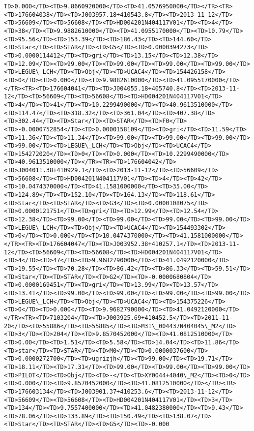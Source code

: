 \documentclass[11pt]{article}
\begin{document}
\begin{Verbatim}[commandchars=\\\{\}]
TD>0.000</TD><TD>9.8660920000</TD><TD>41.0576950000</TD></TR><TR><TD>176604038</TD><TD>J003957.18+410543.8</TD><TD>2013-11-12</TD><TD>56609</TD><TD>56608</TD><TD>HD004201N404117V01</TD><TD>4</TD><TD>38</TD><TD>9.9882610000</TD><TD>41.0955170000</TD><TD>10.79</TD><TD>95.56</TD><TD>153.39</TD><TD>186.43</TD><TD>144.60</TD><TD>Star</TD><TD>STAR</TD><TD>G5</TD><TD>0.0000394273</TD><TD>0.0000114412</TD><TD>gri</TD><TD>13.15</TD><TD>12.38</TD><TD>12.09</TD><TD>99.00</TD><TD>99.00</TD><TD>99.00</TD><TD>99.00</TD><TD>LEGUE\_LCH</TD><TD>Obj</TD><TD>UCAC4</TD><TD>154426158</TD><TD>0</TD><TD>0.000</TD><TD>9.9882610000</TD><TD>41.0955170000</TD></TR><TR><TD>176604041</TD><TD>J004055.18+405740.8</TD><TD>2013-11-12</TD><TD>56609</TD><TD>56608</TD><TD>HD004201N404117V01</TD><TD>4</TD><TD>41</TD><TD>10.2299490000</TD><TD>40.9613510000</TD><TD>114.47</TD><TD>318.32</TD><TD>361.04</TD><TD>407.38</TD><TD>302.44</TD><TD>Star</TD><TD>STAR</TD><TD>F0</TD><TD>-0.0000752854</TD><TD>0.0000158109</TD><TD>gri</TD><TD>11.59</TD><TD>11.36</TD><TD>11.34</TD><TD>99.00</TD><TD>99.00</TD><TD>99.00</TD><TD>99.00</TD><TD>LEGUE\_LCH</TD><TD>Obj</TD><TD>UCAC4</TD><TD>154272020</TD><TD>0</TD><TD>0.000</TD><TD>10.2299490000</TD><TD>40.9613510000</TD></TR><TR><TD>176604042</TD><TD>J004011.38+410929.1</TD><TD>2013-11-12</TD><TD>56609</TD><TD>56608</TD><TD>HD004201N404117V01</TD><TD>4</TD><TD>42</TD><TD>10.0474370000</TD><TD>41.1581000000</TD><TD>35.00</TD><TD>124.89</TD><TD>152.10</TD><TD>164.13</TD><TD>118.61</TD><TD>Star</TD><TD>STAR</TD><TD>G3</TD><TD>0.0000108075</TD><TD>0.0000121751</TD><TD>gri</TD><TD>12.99</TD><TD>12.54</TD><TD>12.38</TD><TD>99.00</TD><TD>99.00</TD><TD>99.00</TD><TD>99.00</TD><TD>LEGUE\_LCH</TD><TD>Obj</TD><TD>UCAC4</TD><TD>154493302</TD><TD>0</TD><TD>0.000</TD><TD>10.0474370000</TD><TD>41.1581000000</TD></TR><TR><TD>176604047</TD><TD>J003952.38+410257.1</TD><TD>2013-11-12</TD><TD>56609</TD><TD>56608</TD><TD>HD004201N404117V01</TD><TD>4</TD><TD>47</TD><TD>9.9682790000</TD><TD>41.0492120000</TD><TD>19.55</TD><TD>70.28</TD><TD>86.42</TD><TD>86.33</TD><TD>59.51</TD><TD>Star</TD><TD>STAR</TD><TD>G2</TD><TD>-0.0000680804</TD><TD>0.0000169451</TD><TD>gri</TD><TD>13.99</TD><TD>13.57</TD><TD>13.41</TD><TD>99.00</TD><TD>99.00</TD><TD>99.00</TD><TD>99.00</TD><TD>LEGUE\_LCH</TD><TD>Obj</TD><TD>UCAC4</TD><TD>154375226</TD><TD>0</TD><TD>0.000</TD><TD>9.9682790000</TD><TD>41.0492120000</TD></TR><TR><TD>7103204</TD><TD>J003925.69+410452.5</TD><TD>2011-11-20</TD><TD>55886</TD><TD>55885</TD><TD>M31\_004437N404045\_M2</TD><TD>3</TD><TD>204</TD><TD>9.8570452000</TD><TD>41.0812510000</TD><TD>0.00</TD><TD>1.51</TD><TD>5.58</TD><TD>14.04</TD><TD>11.86</TD><TD>star</TD><TD>STAR</TD><TD>M0</TD><TD>0.0000037600</TD><TD>0.0000272700</TD><TD>ugrizjh</TD><TD>99.00</TD><TD>19.71</TD><TD>18.11</TD><TD>17.31</TD><TD>99.00</TD><TD>99.00</TD><TD>99.00</TD><TD>PILOT</TD><TD>Obj</TD><TD>-</TD><TD>XY0044+4040\_M2</TD><TD>0</TD><TD>0.000</TD><TD>9.8570452000</TD><TD>41.0812510000</TD></TR><TR><TD>176603134</TD><TD>J003901.37+410253.6</TD><TD>2013-11-12</TD><TD>56609</TD><TD>56608</TD><TD>HD004201N404117V01</TD><TD>3</TD><TD>134</TD><TD>9.7557400000</TD><TD>41.0482380000</TD><TD>9.43</TD><TD>78.06</TD><TD>133.89</TD><TD>150.49</TD><TD>138.07</TD><TD>Star</TD><TD>STAR</TD><TD>G5</TD><TD>-0.000
\end{Verbatim}
\end{document}
